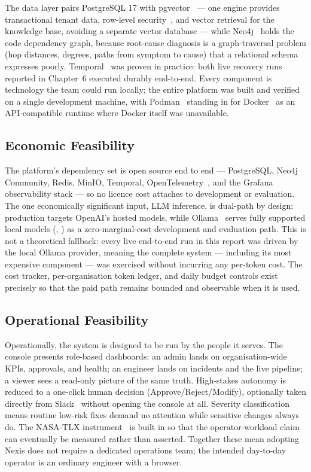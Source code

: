 The data layer pairs PostgreSQL 17 with pgvector~\cite{pgvector} --- one
engine provides transactional tenant data, row-level
security~\cite{pgrls}, and vector retrieval for the knowledge base, avoiding
a separate vector database --- while Neo4j~\cite{neo4j} holds the code
dependency graph, because root-cause diagnosis is a graph-traversal problem
(hop distances, degrees, paths from symptom to cause) that a relational
schema expresses poorly. Temporal~\cite{temporal} was proven in practice:
both live recovery runs reported in Chapter~6 executed durably end-to-end.
Every component is technology the team could run locally; the entire
platform was built and verified on a single development machine, with
Podman~\cite{podman} standing in for Docker~\cite{docker} as an
API-compatible runtime where Docker itself was unavailable.

\subsection{Economic Feasibility}

The platform's dependency set is open source end to end --- PostgreSQL,
Neo4j Community, Redis, MinIO, Temporal, OpenTelemetry~\cite{otel}, and the
Grafana observability stack --- so no licence cost attaches to development or
evaluation. The one economically significant input, LLM inference, is
dual-path by design: production targets OpenAI's hosted models, while
Ollama~\cite{ollama} serves fully supported local models
(, ) as a zero-marginal-cost
development and evaluation path. This is not a theoretical fallback: every
live end-to-end run in this report was driven by the local Ollama provider,
meaning the complete system --- including its most expensive component ---
was exercised without incurring any per-token cost. The cost tracker,
per-organisation token ledger, and daily budget controls exist precisely so
that the paid path remains bounded and observable when it is used.

\subsection{Operational Feasibility}

Operationally, the system is designed to be run by the people it serves. The
console presents role-based dashboards: an admin lands on organisation-wide
KPIs, approvals, and health; an engineer lands on incidents and the live
pipeline; a viewer sees a read-only picture of the same truth. High-stakes
autonomy is reduced to a one-click human decision (Approve/Reject/Modify),
optionally taken directly from Slack~\cite{slackapi} without opening the
console at all. Severity classification means routine low-risk fixes demand
no attention while sensitive changes always do. The NASA-TLX
instrument~\cite{nasatlx} is built in so that the operator-workload claim can
eventually be measured rather than asserted. Together these mean adopting
Nexis does not require a dedicated operations team; the intended day-to-day
operator is an ordinary engineer with a browser.
